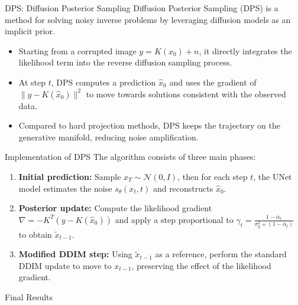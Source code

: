 \begin{frame}{DPS: Diffusion Posterior Sampling}
  Diffusion Posterior Sampling (DPS) is a method for solving noisy inverse problems by leveraging diffusion models as an implicit prior.
  \begin{itemize}
    \item Starting from a corrupted image $y = K(x_0) + n$, it directly integrates the likelihood term into the reverse diffusion sampling process.
    \item At step $t$, DPS computes a prediction $\hat x_0$ and uses the gradient of $\|y - K(\hat x_0)\|^2$ to move towards solutions consistent with the observed data.
    \item Compared to hard projection methods, DPS keeps the trajectory on the generative manifold, reducing noise amplification.
  \end{itemize}
\end{frame}

\begin{frame}[fragile]{Implementation of DPS}
  The algorithm consists of three main phases:
  \begin{enumerate}
    \item \textbf{Initial prediction:} Sample $x_T \sim \mathcal{N}(0, I)$, then for each step $t$, the UNet model estimates the noise $s_\theta(x_t, t)$ and reconstructs $\hat x_0$.
    \item \textbf{Posterior update:} Compute the likelihood gradient $\nabla = -K^T(y - K(\hat x_0))$ and apply a step proportional to $\gamma_t = \frac{1 - \bar\alpha_t}{\sigma_y^2 + (1 - \bar\alpha_t)}$ to obtain $\tilde x_{t-1}$.
    \item \textbf{Modified DDIM step:} Using $\tilde x_{t-1}$ as a reference, perform the standard DDIM update to move to $x_{t-1}$, preserving the effect of the likelihood gradient.
  \end{enumerate}
\end{frame}

\begin{frame}{Final Results}
\end{frame}